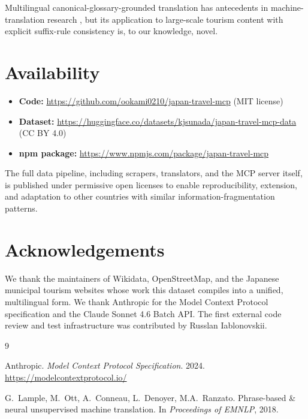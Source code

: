 \documentclass[11pt,a4paper]{article}
\begin{document}
Multilingual canonical-glossary-grounded translation has antecedents in
machine-translation research \cite{lample2018phrase}, but its application
to large-scale tourism content with explicit suffix-rule consistency is,
to our knowledge, novel.

\section{Availability}
\label{sec:availability}

\begin{itemize}
  \item \textbf{Code:} \url{https://github.com/ookami0210/japan-travel-mcp} (MIT license)
  \item \textbf{Dataset:} \url{https://huggingface.co/datasets/kjsunada/japan-travel-mcp-data} (CC BY 4.0)
  \item \textbf{npm package:} \url{https://www.npmjs.com/package/japan-travel-mcp}
\end{itemize}

The full data pipeline, including scrapers, translators, and the MCP
server itself, is published under permissive open licenses to enable
reproducibility, extension, and adaptation to other countries with
similar information-fragmentation patterns.

\section*{Acknowledgements}

We thank the maintainers of Wikidata, OpenStreetMap, and the Japanese
municipal tourism websites whose work this dataset compiles into a
unified, multilingual form. We thank Anthropic for the Model Context
Protocol specification and the Claude Sonnet 4.6 Batch API. The first
external code review and test infrastructure was contributed by
Russlan Iablonovskii.

\begin{thebibliography}{9}

Anthropic.
\textit{Model Context Protocol Specification}.
2024. \url{https://modelcontextprotocol.io/}

G.~Lample, M.~Ott, A.~Conneau, L.~Denoyer, M.A.~Ranzato.
Phrase-based \& neural unsupervised machine translation.
In \textit{Proceedings of EMNLP}, 2018.

\end{thebibliography}
\end{document}
